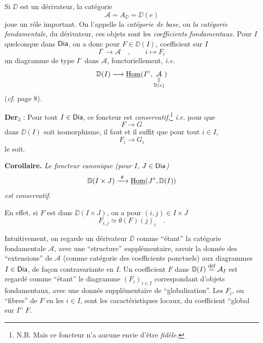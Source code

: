 \noindent{}Si $\DD$ est un dérivateur, la catégorie
\[
\mathcal{A} = A_{\DD} = \DD(e) %
\]
joue un rôle important. On l’appelle la \textit{catégorie de base,} ou \textit{la catégorie fondamentale}, du dérivateur, ces objets sont les \textit{coefficients fondamentaux.} Pour $I$ quelconque dans $\Dia$, on a donc pour $F \in \DD(I)$, coefficient sur $I$ %
\[
I^\circ \longrightarrow \mathcal{A} \quad , \qquad i \longmapsto F_i
\]
un diagramme de type $I^\circ$ dans $\mathcal{A}$, fonctoriellement, \textit{i.e.}
\[
\DD(I)\longrightarrow
\uHom(I^\circ,\underset{\substack{\Vert\\\DD(e)}}{\mathcal A})
\]
(\textit{cf.} page 8).

\noindent\textbf{Der}$_3$ : Pour tout $I \in \Dia$, ce foncteur est \textit{conservatif,}\footnote[4]{N.B. Mais ce foncteur n’a aucune envie d’être \textit{fidèle.}} \textit{i.e.} pour que
\[
F \longrightarrow G
\]
%
dans $\DD(I)$ soit isomorphisme, il faut et il suffit que pour tout $i \in I$,
\[
F_i \longrightarrow G_i
\]
le soit.

\noindent\textbf{Corollaire.} \textit{Le foncteur canonique (pour $I$, $J \in \Dia$)}
\[
\DD(I \times J) \xrightarrow{\ \theta\ } \uHom(J^\circ, \DD(I))
\]
\textit{est conservatif.}

En effet, si $F$ est dans $\DD(I \times J)$, on a pour $(i,j) \in I \times J$
\[
F_{i,j} \simeq \theta(F)(j)_i \quad .
\]

\noindent{}Intuitivement, on regarde un dérivateur $\DD$ comme “étant” la catégorie fondamentale $\mathcal{A}$, avec une “structure” supplémentaire, savoir la donnée des “extensions” de $\mathcal{A}$ (comme catégorie des coefficients ponctuels) aux diagrammes $I \in \Dia$, de façon contravariante en $I$. Un coefficient $F$ dans $\DD(I) \defeq \mathcal{A}_I$ est regardé comme “étant” le diagramme $(F_i)_{i\in I}$ correspondant d’objets fondamentaux, avec une donnée supplémentaire de “globalisation”. Les $F_i$, ou “fibres” de $F$ en les $i \in I$, sont les caractéristiques locaux, du coefficient “global sur $I$” $F$. %


